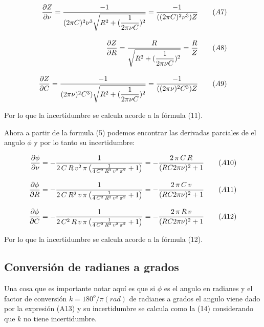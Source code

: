 \documentclass[article, 11pt]{report}
\newcommand{\dpartial}[2]{\frac{\partial #1 }{\partial #2}}
\begin{document}
\begin{equation*}
	\setlength{\jot}{12pt} %
	\begin{split}
		\dpartial{Z}{\nu}= \dfrac{-1}{(2\pi C)^2\nu^3 \sqrt{R^2 + (\dfrac{1}{2 \pi \nu C})^2}} = \dfrac{-1}{((2\pi C)^2 \nu^3 )Z} ~~~~~~ (A7) \\
		\dpartial{Z}{R} = \dfrac{R}{\sqrt{R^2 + (\dfrac{1}{2 \pi \nu C})^2}} = \dfrac{R}{Z} ~~~~~~ (A8) \\
		\dpartial{Z}{C} = \dfrac{-1}{(2\pi \nu)^2 C^3)\sqrt{R^2 + (\dfrac{1}{2 \pi \nu C})^2}} = \dfrac{-1}{((2\pi \nu)^2 C^3 )Z}  ~~~~~~ (A9)
	\end{split}
\end{equation*}

\vspace{0.45cm}
Por lo que la incertidumbre se calcula acorde a la fórmula (11).
\vspace{0.45cm}




\vspace{0.45cm}
Ahora a partir de la formula (5) podemos encontrar las derivadas parciales de el angulo $\phi$ y por lo tanto su incertidumbre:
\vspace{0.45cm}

\begin{equation*}
	\setlength{\jot}{12pt} %
	\begin{split}
		\dpartial{\phi}{\nu}= -\frac{1}{2\,C\,R\,v^2 \,\pi \,{\left(\frac{1}{4\,C^2 \,R^2 \,v^2 \,\pi^2 }+1\right)}} = -\frac{2\,\pi \,C\,R}{(RC2\pi \nu)^2 +1} ~~~~~~ (A10) \\
		\dpartial{\phi}{R} =-\frac{1}{2\,C\,R^2 \,v\,\pi \,{\left(\frac{1}{4\,C^2 \,R^2 \,v^2 \,\pi^2 }+1\right)}} = -\frac{2\,\pi \,C\,v}{(RC2\pi \nu)^2 +1} ~~~~~~ (A11) \\
		\dpartial{\phi}{C} = -\frac{1}{2\,C^2 \,R\,v\,\pi \,{\left(\frac{1}{4\,C^2 \,R^2 \,v^2 \,\pi^2 }+1\right)}}= -\frac{2\,\pi \,R\,v}{(RC2\pi \nu)^2 +1}  ~~~~~~ (A12)
\end{split}
\end{equation*}

\vspace{0.45cm}
Por lo que la incertidumbre se calcula acorde a la fórmula (12).

\subsection*{Conversión de radianes a grados}
Una cosa que es importante notar aquí es que si $\phi$ es el angulo en radianes y el factor de conversión $k=180^o/\pi(rad)$ de radianes a grados el angulo viene dado por la expresión (A13) y su incertidumbre se calcula como la (14) considerando que $k$ no tiene incertidumbre.
\end{document}

